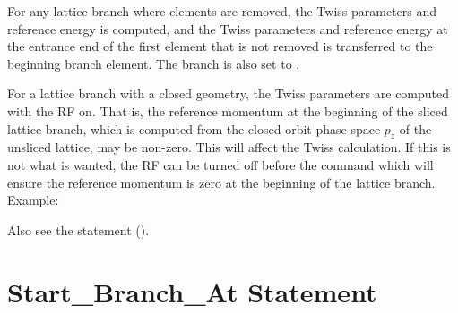 {{{{{For any lattice branch where elements are removed, the Twiss parameters and reference energy is
computed, and the Twiss parameters and reference energy at the entrance end of the first element
that is not removed is transferred to the beginning branch element. The branch  is also
set to .

For a lattice branch with a closed geometry, the Twiss parameters are computed with the RF on. That
is, the reference momentum at the beginning of the sliced lattice branch, which is computed from the
closed orbit phase space $p_z$ of the unsliced lattice, may be non-zero. This will affect the Twiss
calculation. If this is not what is wanted, the RF can be turned off before the 
command which will ensure the reference momentum is zero at the beginning of the lattice
branch. Example:

Also see the  statement ().

\section{Start_Branch_At Statement}
\label{s:start.branch}

}}}}}

